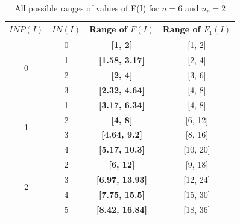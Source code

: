 \begin{table}[t]
\begin{center} \vspace{1mm}
\caption{All possible ranges of values of F(I) for $n=6$ and $n_p=2$}\vspace{-2mm}
\begin{tabular}{|c|c|c|c|}
\hline
$INP(I)$ & $IN(I)$ & \textbf{ Range of $F(I)$ }& Range of $F_1(I)$\\ \hline
\multirow{4}{*}{0} & 0 & \textbf{[1, 2]} & [1, 2]  \\ \cline{2-4}
&1 & \textbf{[1.58, 3.17]} & [2, 4] \\ \cline{2-4}
&2 & \textbf{[2, 4] }& [3, 6] \\ \cline{2-4}
&3 & \textbf{[2.32, 4.64]} & [4, 8] \\
\hline
\multirow{4}{*}{1} & 1 & \textbf{[3.17, 6.34]} & [4, 8] \\ \cline{2-4}
&2 & \textbf{[4, 8]} & [6, 12] \\ \cline{2-4}
&3 & \textbf{[4.64, 9.2]} & [8, 16] \\ \cline{2-4}
&4 & \textbf{[5.17, 10.3]} & [10, 20] \\
\hline
\multirow{4}{*}{2} & 2 & \textbf{[6, 12] }& [9, 18] \\ \cline{2-4}
&3 & \textbf{[6.97, 13.93]} & [12, 24] \\ \cline{2-4}
&4 & \textbf{[7.75, 15.5]} & [15, 30] \\ \cline{2-4}
&5 & \textbf{[8.42, 16.84]} & [18, 36] \\
\hline
\end{tabular}
\label{fitness}
\end{center}
\end{table}

